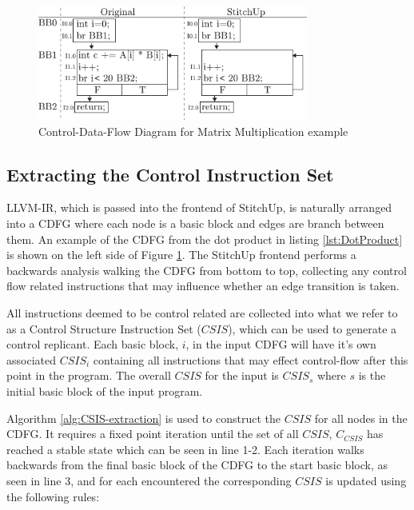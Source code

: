 \begin{figure}[t]
\centering
\includegraphics[width=3.5in]{./imgs/dot_product_cdfg.pdf}
\caption{Control-Data-Flow Diagram for Matrix Multiplication example}
\label{fig:mmm_cdfg}
\end{figure}

\subsection{Extracting the Control Instruction Set}
LLVM-IR, which is passed into the frontend of StitchUp, is naturally arranged into a CDFG
where each node is a basic block and edges are branch between them.
An example of the CDFG from the dot product in listing \ref{lst:DotProduct}
is shown on the left side of Figure \ref{fig:mmm_cdfg}.
The StitchUp frontend performs a backwards analysis walking the CDFG from bottom to top, collecting any control flow
related instructions that may influence whether an edge transition is taken.

All instructions deemed to be control related are collected into what we refer to as a Control Structure Instruction Set ($CSIS$),
which can be used to generate a control replicant.
Each basic block, $i$, in the input CDFG will have it's own associated $CSIS_{i}$ containing all instructions that may effect
control-flow after this point in the program.
The overall $CSIS$ for the input is $CSIS_s$ where $s$ is the initial basic block of the input program.

Algorithm \ref{alg:CSIS-extraction} is used to construct the $CSIS$ for all nodes in the CDFG.
It requires a fixed point iteration until the set of all $CSIS$, $C_{CSIS}$ has reached a stable state
which can be seen in line 1-2.
Each iteration walks backwards from the final basic block of the CDFG to the start basic block, as seen in
line 3, and for each encountered the corresponding $CSIS$ is updated using the following rules:

